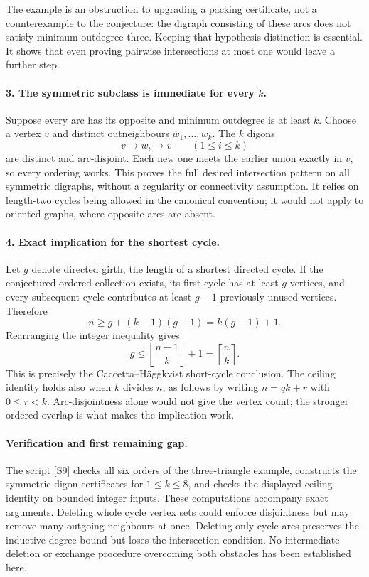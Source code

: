 \documentclass[11pt,a4paper]{article}
\begin{document}
The example is an obstruction to upgrading a packing certificate,
not a counterexample to the conjecture: the digraph consisting of
these arcs does not satisfy minimum outdegree three. Keeping that
hypothesis distinction is essential. It shows that even proving
pairwise intersections at most one would leave a further step.

\paragraph{3. The symmetric subclass is immediate for every $k$.}
Suppose every arc has its opposite and minimum outdegree is at least
$k$. Choose a vertex $v$ and distinct outneighbours
$w_1,\ldots,w_k$. The $k$ digons
\[
              v\to w_i\to v\qquad(1\le i\le k)
\]
are distinct and arc-disjoint. Each new one meets the earlier union
exactly in $v$, so every ordering works. This proves the full desired
intersection pattern on all symmetric digraphs, without a regularity
or connectivity assumption. It relies on length-two cycles being
allowed in the canonical convention; it would not apply to oriented
graphs, where opposite arcs are absent.

\paragraph{4. Exact implication for the shortest cycle.}
Let $g$ denote directed girth, the length of a shortest directed
cycle. If the conjectured ordered collection exists, its first
cycle has at least $g$ vertices, and every subsequent cycle
contributes at least $g-1$ previously unused vertices. Therefore
\[
 n\ge g+(k-1)(g-1)=k(g-1)+1.
\]
Rearranging the integer inequality gives
\[
 g\le\left\lfloor\frac{n-1}{k}\right\rfloor+1
       =\left\lceil\frac nk\right\rceil.
\]
This is precisely the Caccetta--H\"aggkvist short-cycle conclusion.
The ceiling identity holds also when $k$ divides $n$, as follows
by writing $n=qk+r$ with $0\le r<k$. Arc-disjointness alone would
not give the vertex count; the stronger ordered overlap is what
makes the implication work.

\paragraph{Verification and first remaining gap.}
The script [S9] checks all six orders of the three-triangle
example, constructs the symmetric digon certificates for
$1\le k\le8$, and checks the displayed ceiling identity on bounded
integer inputs. These computations accompany exact arguments.
Deleting whole cycle vertex sets could enforce disjointness but may
remove many outgoing neighbours at once. Deleting only cycle arcs
preserves the inductive degree bound but loses the intersection
condition. No intermediate deletion or exchange procedure overcoming
both obstacles has been established here.
\end{document}
